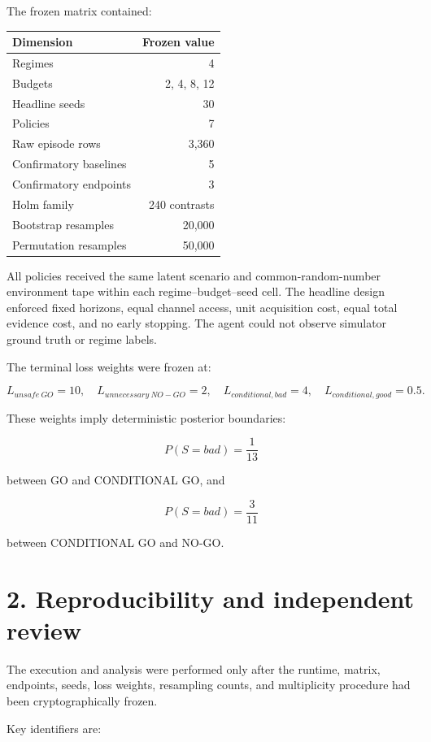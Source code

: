\documentclass[11pt,a4paper]{article}
\begin{document}
The frozen matrix contained:

\begin{center}
\begin{tabular}{lr}
\toprule
Dimension & Frozen value \\
\midrule
Regimes & 4 \\
Budgets & 2, 4, 8, 12 \\
Headline seeds & 30 \\
Policies & 7 \\
Raw episode rows & 3,360 \\
Confirmatory baselines & 5 \\
Confirmatory endpoints & 3 \\
Holm family & 240 contrasts \\
Bootstrap resamples & 20,000 \\
Permutation resamples & 50,000 \\
\bottomrule
\end{tabular}
\end{center}

All policies received the same latent scenario and common-random-number environment tape within each regime--budget--seed cell. The headline design enforced fixed horizons, equal channel access, unit acquisition cost, equal total evidence cost, and no early stopping. The agent could not observe simulator ground truth or regime labels.

The terminal loss weights were frozen at:

\[
L_{unsafe\ GO}=10,\quad L_{unnecessary\ NO\!\!\!-\!\!GO}=2,
\quad L_{conditional,bad}=4,\quad L_{conditional,good}=0.5.
\]

These weights imply deterministic posterior boundaries:

\[
P(S=bad)=\frac{1}{13}
\]

between GO and CONDITIONAL GO, and

\[
P(S=bad)=\frac{3}{11}
\]

between CONDITIONAL GO and NO-GO.

\section*{2. Reproducibility and independent review}

The execution and analysis were performed only after the runtime, matrix, endpoints, seeds, loss weights, resampling counts, and multiplicity procedure had been cryptographically frozen.

Key identifiers are:
\end{document}
